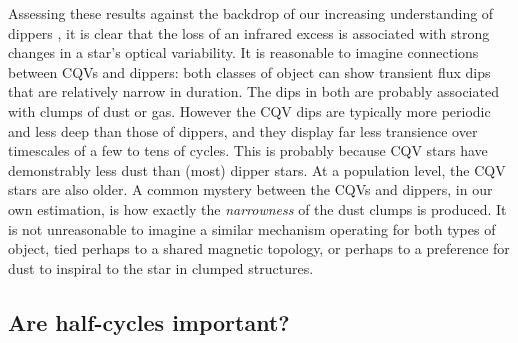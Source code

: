 \documentclass[11pt,twocolumn,tighten]{aastex63}
\begin{document}
Assessing these results against the backdrop of our increasing
understanding of dippers
\citep[e.g.][]{2014AJ....147...82C,2016ApJ...816...69A,2021ApJ...908...16R,2022ApJS..263...14C},
it is clear that the loss of an infrared excess is associated with
strong changes in a star's optical variability.  It is reasonable to
imagine connections between CQVs and dippers: both classes of object
can show transient flux dips that are relatively narrow in duration.
The dips in both are probably associated with clumps of dust or gas.
However the CQV dips are typically more periodic and 
less deep than those of dippers, and they display far
less transience over timescales of a few to tens of cycles.  This is
probably because CQV stars have demonstrably less dust than (most)
dipper stars.  At a population level, the CQV stars are also older.  A
common mystery between the CQVs and dippers, in our own estimation, is
how exactly the {\it narrowness} of the dust clumps is produced.  It
is not unreasonable to imagine a similar mechanism operating for both
types of object, tied perhaps to a shared magnetic topology, or
perhaps to a preference for dust to inspiral to the star in clumped
structures.


%


\subsection{Are half-cycles important?}
\end{document}
